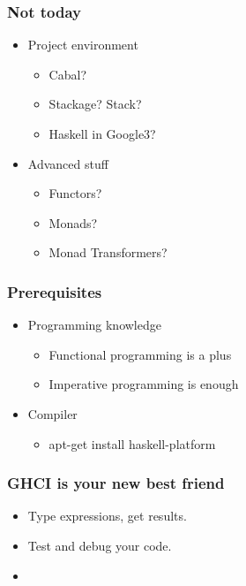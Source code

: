 \documentclass[17pt]{beamer}
\renewcommand{\(}[1]{\begin{columns}[#1]}
\renewcommand{\)}{\end{columns}}
\newcommand{\<}[1]{\begin{column}{#1}}
\renewcommand{\>}{\end{column}}
\begin{document}
\begin{frame}
  \frametitle{Not today}
  \begin{center}
  \begin{itemize}
  \item Project environment
    \begin{itemize}
    \item Cabal?
    \item Stackage? Stack?
    \item Haskell in Google3?
    \end{itemize}
  \end{itemize}
  \begin{itemize}
  \item Advanced stuff
    \begin{itemize}
    \item Functors?
    \item Monads?
    \item Monad Transformers?
    \end{itemize}
  \end{itemize}
  \end{center}
\end{frame}

\begin{frame}
  \frametitle{Prerequisites}
  \begin{center}
  \begin{itemize}
    \item Programming knowledge
      \begin{itemize}
      \item Functional programming is a plus
      \item Imperative programming is enough
      \end{itemize}
    \item Compiler
      \begin{itemize}
      \item apt-get install haskell-platform
      \end{itemize}
  \end{itemize}
  \end{center}
\end{frame}

\begin{frame}
  \frametitle{GHCI is your new best friend}
  \begin{center}
  \begin{itemize}
    \item Type expressions, get results.
    \item Test and debug your code.
    \item {}
  \end{itemize}
  \end{center}
\end{frame}
\end{document}
